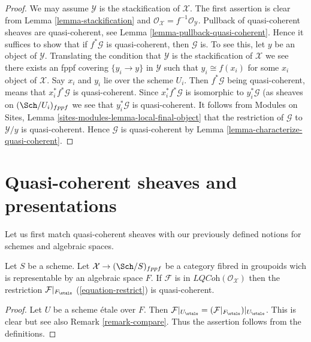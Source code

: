 \begin{proof}
We may assume $\mathcal{Y}$ is the stackification of $\mathcal{X}$.
The first assertion is clear from
Lemma \ref{lemma-stackification}
and
$\mathcal{O}_\mathcal{X} = f^{-1}\mathcal{O}_\mathcal{Y}$.
Pullback of quasi-coherent sheaves are quasi-coherent, see
Lemma \ref{lemma-pullback-quasi-coherent}.
Hence it suffices to show that if $f^*\mathcal{G}$ is
quasi-coherent, then $\mathcal{G}$ is.
To see this, let $y$ be an object of $\mathcal{Y}$.
Translating the condition that $\mathcal{Y}$ is the stackification
of $\mathcal{X}$ we see there exists an fppf covering $\{y_i \to y\}$
in $\mathcal{Y}$ such that $y_i \cong f(x_i)$ for some
$x_i$ object of $\mathcal{X}$. Say $x_i$ and $y_i$ lie over the scheme $U_i$.
Then $f^*\mathcal{G}$ being quasi-coherent, means that $x_i^*f^*\mathcal{G}$
is quasi-coherent. Since $x_i^*f^*\mathcal{G}$ is isomorphic to
$y_i^*\mathcal{G}$ (as sheaves on $(\Sch/U_i)_{fppf}$ we
see that $y_i^*\mathcal{G}$ is quasi-coherent.
It follows from
Modules on Sites, Lemma \ref{sites-modules-lemma-local-final-object}
that the restriction of $\mathcal{G}$ to $\mathcal{Y}/y$ is
quasi-coherent. Hence $\mathcal{G}$ is quasi-coherent by
Lemma \ref{lemma-characterize-quasi-coherent}.
\end{proof}





\section{Quasi-coherent sheaves and presentations}
\label{section-quasi-coherent-presentation}

\noindent
Let us first match quasi-coherent sheaves with our previously defined
notions for schemes and algebraic spaces.

\begin{lemma}
\label{lemma-compare-locally-quasi-coherent}
Let $S$ be a scheme. Let $\mathcal{X} \to (\Sch/S)_{fppf}$ be a category
fibred in groupoids wich is representable by an algebraic space $F$.
If $\mathcal{F}$ is in $\textit{LQCoh}(\mathcal{O}_\mathcal{X})$
then the restriction $\mathcal{F}|_{F_\etale}$ (\ref{equation-restrict}) 
is quasi-coherent.
\end{lemma}

\begin{proof}
Let $U$ be a scheme \'etale over $F$. Then
$\mathcal{F}|_{U_\etale} = (\mathcal{F}|_{F_\etale})|_{U_\etale}$.
This is clear but see also Remark \ref{remark-compare}.
Thus the assertion follows from the definitions.
\end{proof}

